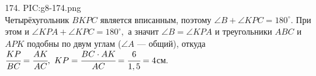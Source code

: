 174. {{PIC:g8-174.png}}\\
Четырёхугольник $BKPC$ является вписанным, поэтому $\angle B+\angle KPC=180^\circ.$ При этом и $\angle KPA+\angle KPC=180^\circ,$ а значит $\angle B=\angle KPA$ и треугольники $ABC$ и $APK$ подобны по двум углам ($\angle A$ --- общий), откуда $\cfrac{KP}{BC}=\cfrac{AK}{AC},\ KP=\cfrac{BC\cdot AK}{AC}=\cfrac{6}{1,5}=4$см.\\
